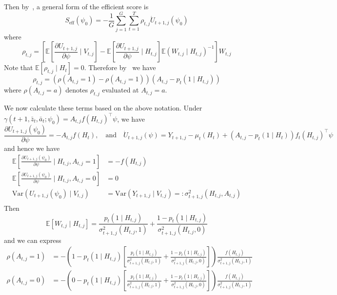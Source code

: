 \documentclass[12pt]{article}
\begin{document}
Then by~\cite[Lemma I.8]{Qian2021}, a general form of the efficient score is
$$
S_{\text{eff}} (\psi_0) = - \frac{1}{G} \sum_{j=1}^G \sum_{t=1}^T \rho_{t,j} \dot{U}_{t+1,j} (\psi_0)
$$
where
$$
\rho_{t,j} = \left[ \mathbb{E} \left[ \frac{\partial U_{t+1,j}}{\partial \psi} \mid V_{t,j} \right] - \mathbb{E} \left[ \frac{\partial U_{t+1,j}}{\partial \psi} \mid H_{t,j} \right] \mathbb{E} \left( W_{t,j} \mid H_{t,j} \right)^{-1} \right] W_{t,j}
$$
Note that $\mathbb{E} \left[ \rho_{t,j} \mid H_t \right] = 0$.  Therefore by~\cite[Lemma I.1]{Qian2021} we have
$$
\rho_{t,j} = \left( \rho(A_{t,j} = 1) - \rho(A_{t,j} = 1) \right) (A_{t,j} - p_t (1 \mid H_{t,j}))
$$
where  $\rho(A_{t,j} = a)$ denotes $\rho_{t,j}$ evaluated at $A_{t,j} = a$.

We now calculate these terms based on the above notation. Under $\gamma(t+1, \bar z_t, \bar a_t; \psi_0) = A_{t,j} f(H_{t,j})^\top \psi$, we have
$$
\frac{\partial U_{t+1,j} (\psi_0)}{\partial \psi} = - A_{t,j} f(H_t), \quad \text{and} \quad
\dot{U}_{t+1,j} (\psi) = Y_{t+1,j} - \mu_t (H_t) + (A_{t,j}-p_t(1 \mid H_t)) f_t(H_{t,j})^\top \psi
$$
and hence we have
\begin{align*}
\mathbb{E} \left[ \frac{\partial U_{t+1,j} (\psi_0)}{\partial \psi} \mid H_{t,j}, A_{t,j} = 1 \right] &= - f(H_{t,j}) \\
\mathbb{E} \left[ \frac{\partial U_{t+1,j} (\psi_0)}{\partial \psi} \mid H_{t,j}, A_{t,j} = 0 \right] &= 0 \\
\text{Var} \left( U_{t+1,j} (\psi_0) \mid V_{t,j} \right) &=
\text{Var} \left( Y_{t+1,j} \mid V_{t,j} \right) =: \sigma^2_{t+1,j} (H_{t,j}, A_{t,j}) \\
\end{align*}
Then
$$
\mathbb{E} \left[ W_{t,j} \mid H_{t,j} \right] = \frac{p_t (1 \mid H_{t,j} )}{\sigma^2_{t+1,j} (H_{t,j}, 1)} + \frac{1-p_t (1 \mid H_{t,j} )}{\sigma^2_{t+1,j} (H_{t,j}, 0)}
$$
and we can express
\begin{align*}
\rho(A_{t,j} = 1) &= - \left( 1 -p_t ( 1 \mid H_{t,j}) \left[  \frac{p_t (1 \mid H_{t,j} )}{\sigma^2_{t+1,j} (H_{t,j}, 1)} + \frac{1-p_t (1 \mid H_{t,j} )}{\sigma^2_{t+1,j} (H_{t,j}, 0)} \right] \right) \frac{f(H_{t,j})}{\sigma^2_{t+1,j} (H_{t,j}, 1)} \\
\rho(A_{t,j} = 0) &= - \left( 0 -p_t ( 1 \mid H_{t,j}) \left[  \frac{p_t (1 \mid H_{t,j} )}{\sigma^2_{t+1,j} (H_{t,j}, 1)} + \frac{1-p_t (1 \mid H_{t,j} )}{\sigma^2_{t+1,j} (H_{t,j}, 0)} \right] \right) \frac{f(H_{t,j})}{\sigma^2_{t+1,j} (H_{t,j}, 1)}
\end{align*}
\end{document}
